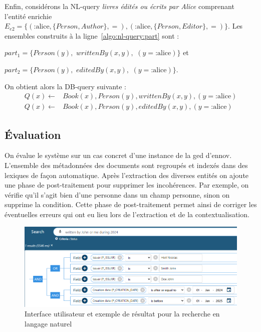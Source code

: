 Enfin, considérons la NL-query \textit{livres édités ou écrits par Alice} comprenant l'entité enrichie $E_{e2} = \{(\text{:alice}, \{Person, Author\}, =), (\text{:alice}, \{Person, Editor\}, =)\}$.
Les ensembles construits à la ligne~\ref{algo:nl-query:part} sont :
\begin{enumerate*}[label=(\roman*)]
    \item $part_1 = \{ Person(y),$ $writtenBy(x, y),$ $(y = \text{:alice}) \}$ et
    \item $part_2 = \{ Person(y),$ $editedBy(x, y),$ $(y = \text{:alice}) \}$.
\end{enumerate*}
On obtient alors la DB-query suivante :
\begin{equation*}
    \begin{split}
        Q(x) \leftarrow & Book(x), Person(y), writtenBy(x, y), (y = \text{:alice}) \\
        Q(x) \leftarrow & Book(x), Person(y), editedBy(x, y), (y = \text{:alice})
    \end{split}
\end{equation*}

\subsection{Évaluation}

On évalue le système sur un cas concret d'une instance de la \gls{ged} d'\gls{ennov}.
L'ensemble des métadonnées des documents sont regroupés et indexés dans des lexiques de façon automatique.
Après l'extraction des diverses entités on ajoute une phase de post-traitement pour supprimer les incohérences.
Par exemple, on vérifie qu'il s'agit bien d'une personne dans un champ personne, sinon on supprime la condition.
Cette phase de post-traitement permet ainsi de corriger les éventuelles erreurs qui ont eu lieu lors de l'extraction et de la contextualisation.

\begin{figure}[htb]
    \centering
    \includegraphics[width=\textwidth]{these/part_2/chapter_2/imgs/ui-nlsearch-compress.png}
    \caption[Interface utilisateur pour la recherche en langage naturel]{Interface utilisateur et exemple de résultat pour la recherche en langage naturel}
    \label{fig:nl-query:ui}
\end{figure}

